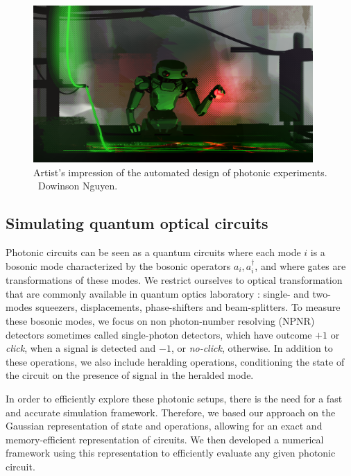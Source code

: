 \begin{figure}
	\begin{center}
		\includegraphics[width=0.95\textwidth]{chapters/deviceindependent/img/illustration_automated_design.png}
	\end{center}
	\caption{Artist's impression of the automated design of photonic experiments. \textcopyright\, Dowinson Nguyen.}
	\label{fig:}
\end{figure}



\subsection{Simulating quantum optical circuits}

Photonic circuits can be seen as a quantum circuits where each mode $i$ is a bosonic mode characterized by the bosonic operators $a_i,a_i^\dagger$, and where gates are transformations of these modes.
We restrict ourselves to optical transformation that are commonly available in quantum optics laboratory : single- and two-modes squeezers, displacements, phase-shifters and beam-splitters.
To measure these bosonic modes, we focus on non photon-number resolving (NPNR) detectors sometimes called single-photon detectors, which have outcome $+1$ or \textit{click}, when a signal is detected and $-1$, or \textit{no-click}, otherwise.
In addition to these operations, we also include heralding operations, conditioning the state of the circuit on the presence of signal in the heralded mode.


In order to efficiently explore these photonic setups, there is the need for a fast and accurate simulation framework.
Therefore, we based our approach on the Gaussian representation of state and operations, allowing for an exact and memory-efficient representation of circuits.
We then developed a numerical framework using this representation to efficiently evaluate any given photonic circuit.


